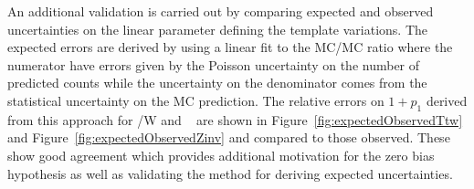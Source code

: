 An additional validation is carried out by comparing expected and observed uncertainties
on the linear parameter defining the template variations.
The expected errors are derived by using a linear fit to the MC/MC ratio where the numerator
have errors given by the Poisson uncertainty on the number of predicted counts while
the uncertainty on the denominator comes from the statistical uncertainty on the
MC prediction. The relative errors on $1+p_1$ derived from this approach 
for \ttbar/W and \zInv~ are shown in Figure~\ref{fig:expectedObservedTtw} 
and Figure~\ref{fig:expectedObservedZinv} and compared to those observed.
These show good agreement which provides additional motivation for the 
zero bias hypothesis as well as validating the method for deriving expected uncertainties.


\begin{figure}[h!]
  \centering
  ~~
  \\
\end{figure}
